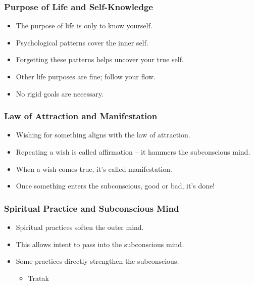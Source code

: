 \begin{frame}[fragile]\frametitle{Purpose of Life and Self-Knowledge}
    \begin{itemize}
        \item The purpose of life is only to know yourself.
        \item Psychological patterns cover the inner self.
        \item Forgetting these patterns helps uncover your true self.
        \item Other life purposes are fine; follow your flow.
        \item No rigid goals are necessary.
    \end{itemize}
\end{frame}

\begin{frame}[fragile]\frametitle{Law of Attraction and Manifestation}
    \begin{itemize}
        \item Wishing for something aligns with the law of attraction.
        \item Repeating a wish is called affirmation – it hammers the subconscious mind.
        \item When a wish comes true, it's called manifestation.
        \item Once something enters the subconscious, good or bad, it’s done!
    \end{itemize}
\end{frame}

\begin{frame}[fragile]\frametitle{Spiritual Practice and Subconscious Mind}
    \begin{itemize}
        \item Spiritual practices soften the outer mind.
        \item This allows intent to pass into the subconscious mind.
        \item Some practices directly strengthen the subconscious:
        \begin{itemize}
            \item Tratak
        \end{itemize}
    \end{itemize}
\end{frame}

